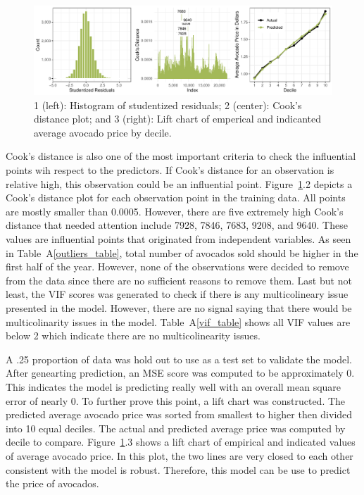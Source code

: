 \documentclass[11pt]{article}\usepackage[]{graphicx}\usepackage[]{color}
\makeatletter
\def\maxwidth{ %
  \ifdim\Gin@nat@width>\linewidth
    \linewidth
  \else
    \Gin@nat@width
  \fi
}
\makeatother
\begin{document}
\begin{figure}[h!] 
\begin{center}

\includegraphics[width=\maxwidth]{figure/unnamed-chunk-4-1} 

\caption{1 (left): Histogram of studentized residuals; 2 (center): Cook's distance plot; and 3 (right): Lift chart of emperical and indicanted average avocado price by decile.}
\label{diag1}
\end{center} 
\end{figure}

\noindent Cook's distance is also one of the most important criteria to check the influential points wih respect to the predictors. If Cook's distance for an observation is relative high, this observation could be an influential point. Figure~\ref{diag1}.2 depicts a Cook's distance plot for each observation point in the training data. All points are mostly smaller than 0.0005. However, there are five extremely high Cook's distance that needed attention include 7928, 7846, 7683, 9208, and 9640. These values are influential points that originated from independent variables. As seen in Table~A\ref{outliers_table}, total number of avocados sold should be higher in the first half of the year. However, none of the observations were decided to remove from the data since there are no sufficient reasons to remove them. Last but not least, the VIF scores was generated to check if there is any multicolineary issue presented in the model. However, there are no signal saying that there would be multicolinarity issues in the model. Table~A\ref{vif_table} shows all VIF values are below 2 which indicate there are no multicolinearity issues. 
\hfill \break

\noindent A .25 proportion of data was hold out to use as a test set to validate the model. After genearting prediction, an MSE score was computed to be approximately 0. This indicates the model is predicting really well with an overall mean square error of nearly 0. To further prove this point, a lift chart was constructed. The predicted average avocado price was sorted from smallest to higher then divided into 10 equal deciles. The actual and predicted average price was computed by decile to compare. Figure~\ref{diag1}.3 shows a lift chart of empirical and indicated values of average avocado price. In this plot, the two lines are very closed to each other consistent with the model is robust. Therefore, this model can be use to predict the price of avocados.   
\hfill \break
\end{document}
